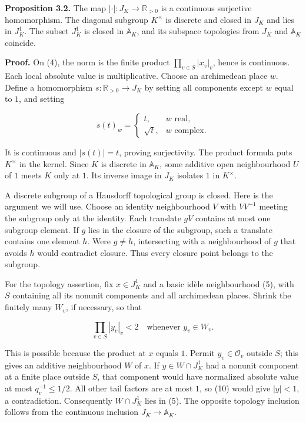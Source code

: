 \documentclass[
  english,
  11pt,
  a4paper,
]{article}
\begin{document}
\textbf{Proposition 3.2.} The map \(|\cdot|:J_K\to\mathbb R_{>0}\) is a
continuous surjective homomorphism. The diagonal subgroup \(K^\times\)
is discrete and closed in \(J_K\) and lies in \(J_K^1\). The subset
\(J_K^1\) is closed in \(\mathbb A_K\), and its subspace topologies from
\(J_K\) and \(\mathbb A_K\) coincide.

\textbf{Proof.} On (4), the norm is the finite product
\(\prod_{v\in S}|x_v|_v\), hence is continuous. Each local absolute
value is multiplicative. Choose an archimedean place \(w\). Define a
homomorphism \(s:\mathbb R_{>0}\to J_K\) by setting all components
except \(w\) equal to \(1\), and setting

\[s(t)_w=\begin{cases}t,&w\text{ real},\\ \sqrt t,&w\text{ complex}.
\end{cases}
\tag{9}\]

It is continuous and \(|s(t)|=t\), proving surjectivity. The product
formula puts \(K^\times\) in the kernel. Since \(K\) is discrete in
\(\mathbb A_K\), some additive open neighbourhood \(U\) of \(1\) meets
\(K\) only at \(1\). Its inverse image in \(J_K\) isolates \(1\) in
\(K^\times\).

A discrete subgroup of a Hausdorff topological group is closed. Here is
the argument we will use. Choose an identity neighbourhood \(V\) with
\(VV^{-1}\) meeting the subgroup only at the identity. Each translate
\(gV\) contains at most one subgroup element. If \(g\) lies in the
closure of the subgroup, such a translate contains one element \(h\).
Were \(g\ne h\), intersecting with a neighbourhood of \(g\) that avoids
\(h\) would contradict closure. Thus every closure point belongs to the
subgroup.

For the topology assertion, fix \(x\in J_K^1\) and a basic idèle
neighbourhood (5), with \(S\) containing all its nonunit components and
all archimedean places. Shrink the finitely many \(W_v\), if necessary,
so that

\[\prod_{v\in S}|y_v|_v<2 \quad\text{whenever }y_v\in W_v.
\tag{10}\]

This is possible because the product at \(x\) equals \(1\). Permit
\(y_v\in\mathcal O_v\) outside \(S\); this gives an additive
neighbourhood \(W\) of \(x\). If \(y\in W\cap J_K^1\) had a nonunit
component at a finite place outside \(S\), that component would have
normalized absolute value at most \(q_v^{-1}\leq 1/2\). All other tail
factors are at most \(1\), so (10) would give \(|y|<1\), a
contradiction. Consequently \(W\cap J_K^1\) lies in (5). The opposite
topology inclusion follows from the continuous inclusion
\(J_K\to\mathbb A_K\).
\end{document}
